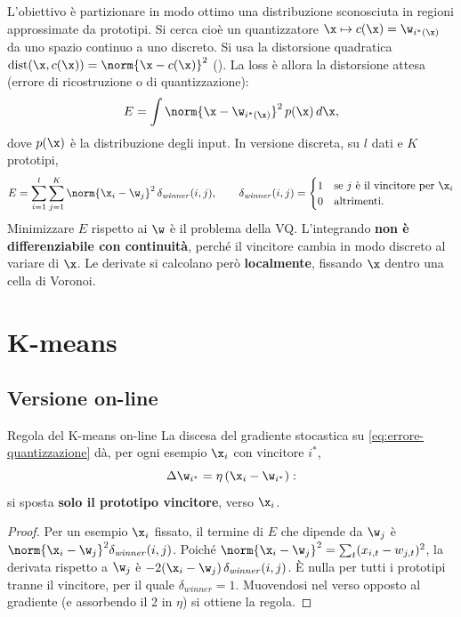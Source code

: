 L'obiettivo è partizionare in modo ottimo una distribuzione sconosciuta in regioni approssimate da prototipi. Si
cerca cioè un quantizzatore $\x\mapsto c(\x) = \w_{i^*(\x)}$ da uno spazio continuo a uno discreto. Si usa la
distorsione quadratica $\mathrm{dist}(\x,c(\x)) = \norm{\x-c(\x)}^2$ (). La loss è allora la
distorsione attesa (errore di ricostruzione o di quantizzazione):
\[
E = \int\norm{\x-\w_{i^*(\x)}}^2\,p(\x)\,d\x ,
\]
dove $p(\x)$ è la distribuzione degli input. In versione discreta, su $l$ dati e $K$ prototipi,
\begin{equation}\label{eq:errore-quantizzazione}
E = \sum_{i=1}^{l}\sum_{j=1}^{K}\norm{\x_i-\w_j}^2\,\delta_{\mathit{winner}}(i,j),\qquad
\delta_{\mathit{winner}}(i,j) = \begin{cases}1 & \text{se } j \text{ è il vincitore per } \x_i\\ 0 & \text{altrimenti.}\end{cases}
\end{equation}
Minimizzare $E$ rispetto ai $\w$ è il problema della VQ. L'integrando \textbf{non è differenziabile con continuità},
perché il vincitore cambia in modo discreto al variare di $\x$. Le derivate si calcolano però \textbf{localmente},
fissando $\x$ dentro una cella di Voronoi.

\section{K-means}

\subsection{Versione on-line}

\begin{proprieta}{Regola del K-means on-line}
La discesa del gradiente stocastica su \eqref{eq:errore-quantizzazione} dà, per ogni esempio $\x_i$ con vincitore
$i^*$,
\[
\Delta\w_{i^*} = \eta\,(\x_i-\w_{i^*}) :
\]
si sposta \textbf{solo il prototipo vincitore}, verso $\x_i$.
\end{proprieta}
\begin{proof}
Per un esempio $\x_i$ fissato, il termine di $E$ che dipende da $\w_j$ è $\norm{\x_i-\w_j}^2\delta_{\mathit{winner}}(i,j)$.
Poiché $\norm{\x_i-\w_j}^2 = \sum_t(x_{i,t}-w_{j,t})^2$, la derivata rispetto a $\w_j$ è
$-2(\x_i-\w_j)\,\delta_{\mathit{winner}}(i,j)$. È nulla per tutti i prototipi tranne il vincitore, per il quale
$\delta_{\mathit{winner}}=1$. Muovendosi nel verso opposto al gradiente (e assorbendo il 2 in $\eta$) si ottiene la
regola.
\end{proof}

